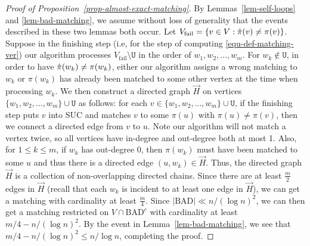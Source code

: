 \documentclass[11pt]{article}
\numberwithin{equation}{section}
\begin{document}
\begin{proof}[Proof of  Proposition~\ref{prop-almost-exact-matching}]
By Lemmas~\ref{lem-self-loops} and \ref{lem-bad-matching}, we assume without loss of generality that the events described in these two lemmas both occur. Let $V_{\mathrm{fail}} = \{ v \in V : \Hat{\pi}(v) \neq \pi(v) \}$. Suppose in the finishing step (i.e, for the step of computing \eqref{equ-def-matching-ver}) our algorithm processes $V_{\mathrm{fail}} \setminus \mathtt U$ in the order of $w_1, w_2, \ldots, w_m$. For $w_k \not \in \mathtt U$, in order to have $\Hat{\pi}(w_k) \neq \pi(w_k)$, either our algorithm assigns a wrong matching to $w_k$ or $\pi(w_k)$ has already been matched to some other vertex at the time when processing $w_k$. We then construct a directed graph $\overrightarrow{H}$ on vertices $\{ w_1, w_2, \ldots, w_m  \} \cup \mathtt U$ as follows: for each $v \in \{ w_1, w_2, \ldots, w_m  \} \cup \mathtt U$, if the finishing step puts $v$ into $\mathrm{SUC}$ and matches $v$ to some $\pi(u)$ with $\pi(u) \neq \pi(v)$, then we connect a directed edge from $v$ to $u$. Note our algorithm will not match a vertex twice, so all vertices have in-degree and out-degree both at most 1. Also, for $1 \leq k \leq m$, if $w_k$ has out-degree 0, then $\pi(w_k)$ must have been matched to some $u$ and thus there is a directed edge $(u,w_k) \in \overrightarrow{H}$. Thus, the directed graph $\overrightarrow{H}$ is a collection of non-overlapping directed chains. Since there are at least $\frac{m}{2}$ edges in $\overrightarrow{H}$ (recall that each $w_k$ is incident to at least one edge in $\overrightarrow{H}$), we can get a matching with cardinality at least $\frac{m}{4}$. Since $|\mathrm{BAD}| \ll n/(\log n)^2$, we can then get a matching restricted on $V \cap \mathrm{BAD}^c$ with cardinality at least $m/4 - n/(\log n)^2$. By the event in Lemma~\ref{lem-bad-matching}, we see that $m/4 - n/(\log n)^2 \leq n/\log n$, completing the proof.
\end{proof}
\end{document}
